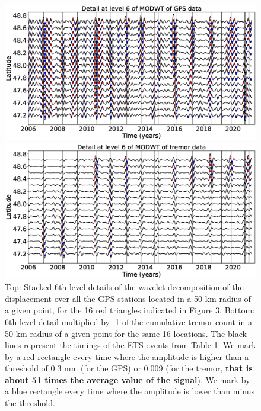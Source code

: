 \documentclass{article}
\begin{document}
\begin{figure}
\noindent\includegraphics[width=\textwidth, trim={0cm 0cm 0cm 0cm},clip]{figures/GPS_longer_detail_6.eps}

\noindent\includegraphics[width=\textwidth, trim={0cm 0cm 0cm 0cm},clip]{figures/tremor_longer_detail_6.eps}
\caption{Top: Stacked 6th level details of the wavelet decomposition of the displacement over all the GPS stations located in a 50 km radius of a given point, for the 16 red triangles indicated in Figure 3. Bottom: 6th level detail multiplied by -1 of the cumulative tremor count in a 50 km radius of a given point for the same 16 locations. The black lines represent the timings of the ETS events from Table 1. We mark by a red rectangle every time where the amplitude is higher than a threshold of 0.3 mm (for the GPS) or 0.009 (for the tremor, \textbf{that is about 51 times the average value of the signal}). We mark by a blue rectangle every time where the amplitude is lower than minus the threshold.}
\label{pngfiguresample}
\end{figure}
\end{document}
